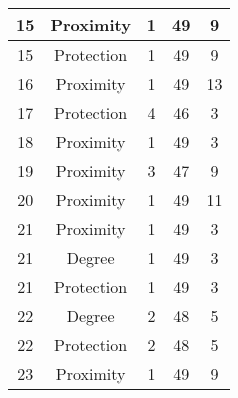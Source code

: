 \documentclass[results.tex]{subfiles}
\begin{document}
\begin{center}
\begin{tabular}{| c || c | c | c | c |}
            \hline
            15                      & Proximity                    & 1                      & 49                      & 9                    \\
            \hline
            15                      & Protection                   & 1                      & 49                      & 9                    \\
            \hline
            16                      & Proximity                    & 1                      & 49                      & 13                   \\
            \hline
            17                      & Protection                   & 4                      & 46                      & 3                    \\
            \hline
            18                      & Proximity                    & 1                      & 49                      & 3                    \\
            \hline
            19                      & Proximity                    & 3                      & 47                      & 9                    \\
            \hline
            20                      & Proximity                    & 1                      & 49                      & 11                   \\
            \hline
            21                      & Proximity                    & 1                      & 49                      & 3                    \\
            \hline
            21                      & Degree                       & 1                      & 49                      & 3                    \\
            \hline
            21                      & Protection                   & 1                      & 49                      & 3                    \\
            \hline
            22                      & Degree                       & 2                      & 48                      & 5                    \\
            \hline
            22                      & Protection                   & 2                      & 48                      & 5                    \\
            \hline
            23                      & Proximity                    & 1                      & 49                      & 9                    \\

\end{tabular}
\end{center}
\end{document}
